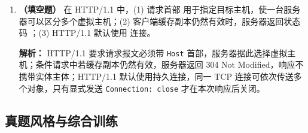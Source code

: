 \begin{enumerate}
\ifshowsolutions\par\noindent\textbf{解析：} DHCP 四步为 DHCPDISCOVER $\to$ DHCPOFFER $\to$ DHCPREQUEST $\to$ DHCPACK。客户端此时还没有可用 IP，DISCOVER 用源地址 0.0.0.0、目的地址 255.255.255.255（受限广播），承载在 UDP 上，客户端用 68 端口发送、服务器在 67 端口接收，故 (A) 正确。REQUEST 采用广播，是为了让未被选中的服务器得知自己的 OFFER 未被接受并释放预留，故 (B) 错误。服务器可以不应答 DISCOVER，OFFER 也可单播或广播，故 (C) 错误。地址有租用期，租期过半时客户端可直接向原服务器发送 REQUEST 续租，无需重走完整四步，故 (D) 错误。\else \answerarea \fi

\item \textbf{（填空题）} 在 HTTP/1.1 中，(1) 请求首部 \underline{\qquad\qquad} 用于指定目标主机，使一台服务器可以区分多个虚拟主机；(2) 客户端缓存副本仍然有效时，服务器返回状态码 \underline{\qquad\qquad}；(3) HTTP/1.1 默认使用 \underline{\qquad\qquad} 连接。

\ifshowsolutions\par\noindent\textbf{解析：} HTTP/1.1 要求请求报文必须带 \texttt{Host} 首部，服务器据此选择虚拟主机；条件请求中若缓存副本仍然有效，服务器返回 304 Not Modified，响应不携带实体主体；HTTP/1.1 默认使用持久连接，同一 TCP 连接可依次传送多个对象，只有显式发送 \texttt{Connection: close} 才在本次响应后关闭。\else \answerarea \fi

\end{enumerate}

\subsection{真题风格与综合训练}

